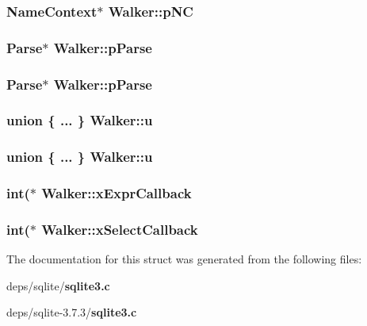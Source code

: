 \subsubsection{\setlength{\rightskip}{0pt plus 5cm}\bf{Name\-Context}$\ast$ \bf{Walker::p\-NC}}\label{structWalker_2587d687b9d866c2085d717fa1270107}


\subsubsection{\setlength{\rightskip}{0pt plus 5cm}\bf{Parse}$\ast$ \bf{Walker::p\-Parse}}\label{structWalker_a19c0edbe7cdcc77f94001859dfdf969}


\subsubsection{\setlength{\rightskip}{0pt plus 5cm}\bf{Parse}$\ast$ \bf{Walker::p\-Parse}}\label{structWalker_a19c0edbe7cdcc77f94001859dfdf969}


\subsubsection{\setlength{\rightskip}{0pt plus 5cm}union \{ ... \}   \bf{Walker::u}}\label{structWalker_7bcbc2c6acf6d282b725d63b6ef25fd7}


\subsubsection{\setlength{\rightskip}{0pt plus 5cm}union \{ ... \}   \bf{Walker::u}}\label{structWalker_7ebd1b7b75cd1589fd48b94fa7d980c9}


\subsubsection{\setlength{\rightskip}{0pt plus 5cm}int($\ast$ \bf{Walker::x\-Expr\-Callback}}\label{structWalker_f8e614b66a0628b016e7a57bac595bbd}


\subsubsection{\setlength{\rightskip}{0pt plus 5cm}int($\ast$ \bf{Walker::x\-Select\-Callback}}\label{structWalker_fd1ac01d8350bdbd17c22077b88af77f}




The documentation for this struct was generated from the following files:\begin{CompactItemize}
\item 
deps/sqlite/\bf{sqlite3.c}\item 
deps/sqlite-3.7.3/\bf{sqlite3.c}\end{CompactItemize}
